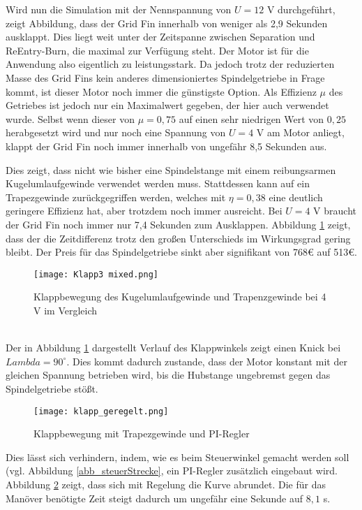 Wird nun die Simulation mit der Nennspannung von $U = 12$ V durchgeführt, zeigt Abbildung, dass der Grid Fin innerhalb von weniger als 2,9 Sekunden ausklappt. Dies liegt weit unter der Zeitspanne zwischen Separation und ReEntry-Burn, die maximal zur Verfügung steht. Der Motor ist für die Anwendung also eigentlich zu leistungsstark. Da jedoch trotz der reduzierten Masse des Grid Fins kein anderes dimensioniertes Spindelgetriebe in Frage kommt, ist dieser Motor noch immer die günstigste Option.
Als Effizienz $\mu$ des Getriebes ist jedoch nur ein Maximalwert gegeben, der hier auch verwendet wurde. Selbst wenn dieser von $\mu = 0,75$ auf einen sehr niedrigen Wert von $0,25$ herabgesetzt wird und nur noch eine Spannung von $U = 4$ V am Motor anliegt, klappt der Grid Fin noch immer innerhalb von ungefähr 8,5 Sekunden aus.

Dies zeigt, dass nicht wie bisher eine Spindelstange mit einem reibungsarmen Kugelumlaufgewinde verwendet werden muss. Stattdessen kann auf ein Trapezgewinde zurückgegriffen werden, welches mit $\eta  = 0,38$ eine deutlich geringere Effizienz hat, aber trotzdem noch immer ausreicht. Bei $U = 4$ V braucht der Grid Fin noch immer nur 7,4 Sekunden zum Ausklappen. Abbildung \ref{abb_klappKG} zeigt, dass der die Zeitdifferenz trotz den großen Unterschieds im Wirkungsgrad gering bleibt. Der Preis für das Spindelgetriebe sinkt aber signifikant von 768€ auf 513€.
\begin{figure}[h] 
	\centering
	\texttt{[image: Klapp3 mixed.png]}
	\caption{Klappbewegung des Kugelumlaufgewinde und Trapenzgewinde bei 4 V im Vergleich}
	\label{abb_klappKG}
\end{figure}\\
Der in Abbildung \ref{abb_klappKG} dargestellt Verlauf des Klappwinkels zeigt einen Knick bei $Lambda = 90^\circ$. Dies kommt dadurch zustande, dass der Motor konstant mit der gleichen Spannung betrieben wird, bis die Hubstange ungebremst gegen das Spindelgetriebe stößt.
\begin{figure}[h] 
	\centering
	\texttt{[image: klapp\_geregelt.png]}
	\caption{Klappbewegung mit Trapezgewinde und PI-Regler}
	\label{abb_klappPI}
\end{figure}
Dies lässt sich verhindern, indem, wie es beim Steuerwinkel gemacht werden soll (vgl. Abbildung \ref{abb_steuerStrecke}, ein PI-Regler zusätzlich eingebaut wird. Abbildung \ref{abb_klappPI} zeigt, dass sich mit Regelung die Kurve abrundet. Die für das Manöver benötigte Zeit steigt dadurch um ungefähr eine Sekunde auf $8,1$ s. 
